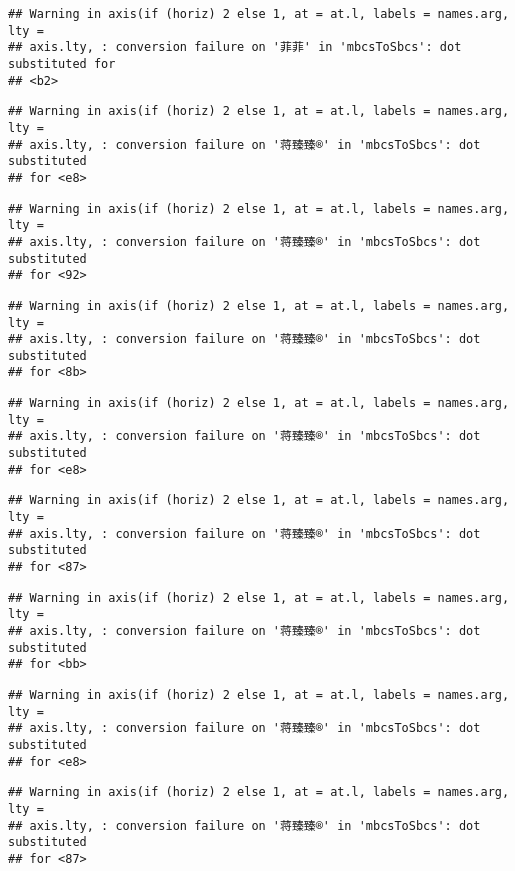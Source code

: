 \documentclass[
]{article}
\begin{document}
\begin{verbatim}
## Warning in axis(if (horiz) 2 else 1, at = at.l, labels = names.arg, lty =
## axis.lty, : conversion failure on '菲菲' in 'mbcsToSbcs': dot substituted for
## <b2>
\end{verbatim}

\begin{verbatim}
## Warning in axis(if (horiz) 2 else 1, at = at.l, labels = names.arg, lty =
## axis.lty, : conversion failure on '蒋臻臻®' in 'mbcsToSbcs': dot substituted
## for <e8>
\end{verbatim}

\begin{verbatim}
## Warning in axis(if (horiz) 2 else 1, at = at.l, labels = names.arg, lty =
## axis.lty, : conversion failure on '蒋臻臻®' in 'mbcsToSbcs': dot substituted
## for <92>
\end{verbatim}

\begin{verbatim}
## Warning in axis(if (horiz) 2 else 1, at = at.l, labels = names.arg, lty =
## axis.lty, : conversion failure on '蒋臻臻®' in 'mbcsToSbcs': dot substituted
## for <8b>
\end{verbatim}

\begin{verbatim}
## Warning in axis(if (horiz) 2 else 1, at = at.l, labels = names.arg, lty =
## axis.lty, : conversion failure on '蒋臻臻®' in 'mbcsToSbcs': dot substituted
## for <e8>
\end{verbatim}

\begin{verbatim}
## Warning in axis(if (horiz) 2 else 1, at = at.l, labels = names.arg, lty =
## axis.lty, : conversion failure on '蒋臻臻®' in 'mbcsToSbcs': dot substituted
## for <87>
\end{verbatim}

\begin{verbatim}
## Warning in axis(if (horiz) 2 else 1, at = at.l, labels = names.arg, lty =
## axis.lty, : conversion failure on '蒋臻臻®' in 'mbcsToSbcs': dot substituted
## for <bb>
\end{verbatim}

\begin{verbatim}
## Warning in axis(if (horiz) 2 else 1, at = at.l, labels = names.arg, lty =
## axis.lty, : conversion failure on '蒋臻臻®' in 'mbcsToSbcs': dot substituted
## for <e8>
\end{verbatim}

\begin{verbatim}
## Warning in axis(if (horiz) 2 else 1, at = at.l, labels = names.arg, lty =
## axis.lty, : conversion failure on '蒋臻臻®' in 'mbcsToSbcs': dot substituted
## for <87>
\end{verbatim}
\end{document}
